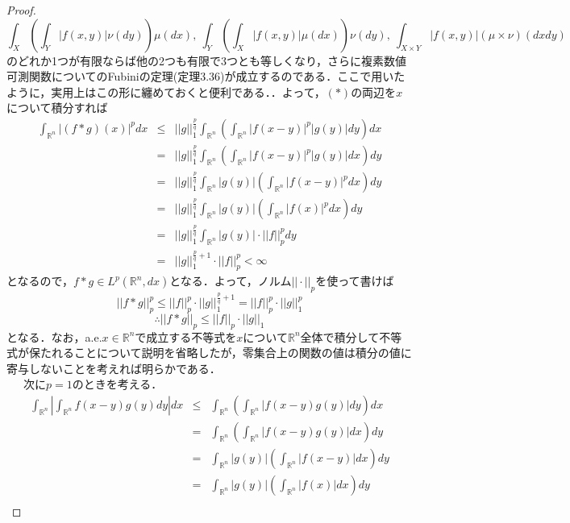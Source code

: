 \documentclass[a4paper,11pt]{jsarticle}
\newtheorem{proof}{証明}
\begin{document}
\begin{proof}
{\begin{equation*}
\int_X\left(\int_Y|f(x,y)| \nu(dy)\right)\mu(dx),{\ }\int_Y\left(\int_X|f(x,y)| \mu(dx)\right)\nu(dy),{\ }\int_{X\times Y}|f(x,y)|(\mu\times\nu)(dxdy)
\end{equation*}
のどれか1つが有限ならば他の2つも有限で3つとも等しくなり，さらに複素数値可測関数についてのFubiniの定理(定理3.36)が成立するのである．ここで用いたように，実用上はこの形に纏めておくと便利である．}．よって，$(\ast)$の両辺を$x$について積分すれば
\begin{eqnarray*}
\int_{\mathbb{R}^n}|(f\ast g)(x)|^p dx&\leq& ||g||_1^{\frac{p}{q}}\int_{\mathbb{R}^n}\left(\int_{\mathbb{R}^n}|f(x-y)|^p|g(y)|dy\right)dx \\
&=&||g||_1^{\frac{p}{q}}\int_{\mathbb{R}^n}\left(\int_{\mathbb{R}^n}|f(x-y)|^p|g(y)|dx\right)dy \\
&=&||g||_1^{\frac{p}{q}}\int_{\mathbb{R}^n}|g(y)|\left(\int_{\mathbb{R}^n}|f(x-y)|^pdx\right)dy \\
&=&||g||_1^{\frac{p}{q}}\int_{\mathbb{R}^n}|g(y)|\left(\int_{\mathbb{R}^n}|f(x)|^pdx\right)dy \\
&=&||g||_1^{\frac{p}{q}}\int_{\mathbb{R}^n}|g(y)|\cdot ||f||_p^p dy \\
&=&||g||_1^{\frac{p}{q}+1}\cdot ||f||_p^p<\infty
\end{eqnarray*}
となるので，$f\ast g\in L^p(\mathbb{R}^n,dx)$となる．よって，ノルム$||\cdot||_p$を使って書けば
\begin{equation*}
||f\ast g||_p^p\leq ||f||_p^p\cdot ||g||_1^{\frac{p}{q}+1}=||f||_p^p\cdot ||g||_1^p
\end{equation*}
\begin{equation*}
\therefore ||f\ast g||_p\leq ||f||_p\cdot ||g||_1
\end{equation*}
となる．なお，a.e.$x\in\mathbb{R}^n$で成立する不等式を$x$について$\mathbb{R}^n$全体で積分して不等式が保たれることについて説明を省略したが，零集合上の関数の値は積分の値に寄与しないことを考えれば明らかである．\\
{\ }{\ }{\ }次に$p=1$のときを考える．
\begin{eqnarray*}
\int_{\mathbb{R}^n}\left|\int_{\mathbb{R}^n}f(x-y)g(y) dy\right|dx&\leq&\int_{\mathbb{R}^n}\left(\int_{\mathbb{R}^n}|f(x-y)g(y)| dy\right)dx \\
&=&\int_{\mathbb{R}^n}\left(\int_{\mathbb{R}^n}|f(x-y)g(y)| dx\right)dy \\
&=&\int_{\mathbb{R}^n}|g(y)|\left(\int_{\mathbb{R}^n}|f(x-y)| dx\right)dy \\
&=&\int_{\mathbb{R}^n}|g(y)|\left(\int_{\mathbb{R}^n}|f(x)| dx\right)dy \\

\end{eqnarray*}
\end{proof}
\end{document}
